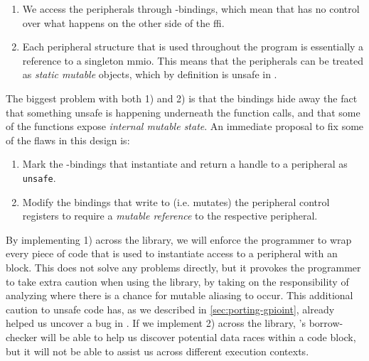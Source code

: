 \begin{enumerate}[\hspace{13pt}1)]
    \item We access the peripherals through {\C}-bindings, which mean that {\rust} has no control over what happens on the other side of the \gls{ffi}.

    \item Each peripheral structure that is used throughout the program is essentially a reference to a singleton \gls{mmio}.
    This means that the peripherals can be treated as \emph{static mutable} objects, which by definition is unsafe in {\rust}.

\end{enumerate}

The biggest problem with both 1) and 2) is that the bindings hide away the fact that something unsafe is happening underneath the function calls, and that some of the functions expose \emph{internal mutable state}.
An immediate proposal to fix some of the flaws in this design is:

\begin{enumerate}[\hspace{13pt}1)]
    \item Mark the {\rust}-bindings that instantiate and return a handle to a peripheral as \texttt{unsafe}.

    \item Modify the bindings that write to (i.e. mutates) the peripheral control registers to require a \emph{mutable reference} to the respective peripheral.
\end{enumerate}

By implementing 1) across the  library, we will enforce the programmer to wrap every piece of code that is used to instantiate access to a peripheral with an  block.
This does not solve any problems directly, but it provokes the programmer to take extra caution when using the library, by taking on the responsibility of analyzing where there is a chance for mutable aliasing to occur.
This additional caution to unsafe code has, as we described in \autoref{sec:porting-gpioint}, already helped us uncover a bug in .
If we implement 2) across the library, {\rust}'s borrow-checker will be able to help us discover potential data races within a code block, but it will not be able to assist us across different execution contexts.

